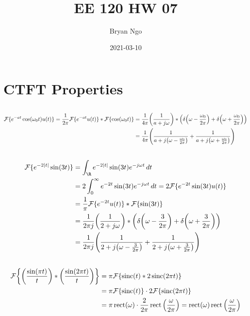 \documentclass{article}
\title{EE 120 HW 07}
\author{Bryan Ngo}
\date{2021-03-10}
\newcommand{\F}{\mathcal{F}}
\newcommand{\sinc}{\operatorname{sinc}}
\newcommand{\rect}{\operatorname{rect}}
\begin{document}
\maketitle

\section{CTFT Properties}

\subsection{}

\begin{align}
    \F\{e^{-at} \cos(\omega_0 t) u(t)\} = \frac{1}{2\pi} \F\{e^{-at} u(t)\} \ast \F\{\cos(\omega_0 t)\} &= \frac{1}{4\pi} \qty(\frac{1}{a + j \omega}) \ast \qty(\delta\qty(\omega - \frac{\omega_0}{2\pi}) + \delta\qty(\omega + \frac{\omega_0}{2\pi})) \\
    &= \frac{1}{4\pi} \qty(\frac{1}{a + j \qty(\omega - \frac{\omega_0}{2\pi})} + \frac{1}{a + j \qty(\omega + \frac{\omega_0}{2\pi})})
\end{align}

\subsection{}

\begin{align}
    \F\{e^{-2 |t|} \sin(3t)\} &= \int_{\R} e^{-2 |t|} \sin(3t) e^{-j \omega t} \, dt \\
    &= 2 \int_0^\infty e^{-2t} \sin(3t) e^{-j \omega t} \, dt = 2\F\{e^{-2t} \sin(3t) u(t)\} \\
    &= \frac{1}{\pi} \F\{e^{-2t} u(t)\} \ast \F\{\sin(3t)\} \\
    &= \frac{1}{2\pi j} \qty(\frac{1}{2 + j \omega}) \ast \qty(\delta\qty(\omega - \frac{3}{2\pi}) + \delta\qty(\omega + \frac{3}{2\pi})) \\
    &= \frac{1}{2\pi j} \qty(\frac{1}{2 + j \qty(\omega - \frac{3}{2\pi})} + \frac{1}{2 + j \qty(\omega + \frac{3}{2\pi})})
\end{align}

\subsection{}

\begin{align}
    \F\qty{\qty(\frac{\sin(\pi t)}{t}) \ast \qty(\frac{\sin(2\pi t)}{t})} &= \pi \F\{\sinc(t) \ast 2 \sinc(2\pi t)\} \\
    &= \pi \F\{\sinc(t)\} \cdot 2 \F\{\sinc(2\pi t)\} \\
    &= \pi \rect(\omega) \cdot \frac{2}{2\pi} \rect\qty(\frac{\omega}{2\pi}) = \rect(\omega) \rect\qty(\frac{\omega}{2\pi})
\end{align}
\end{document}
